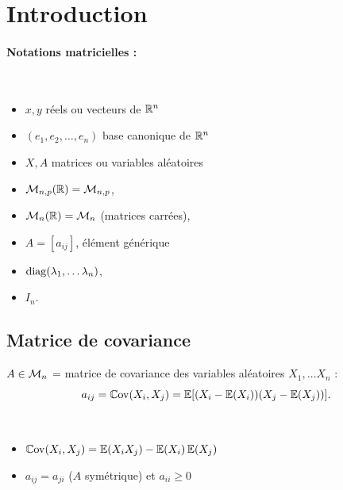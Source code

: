 \section{Introduction} \label{sec:LinAlg-Intro}

\paragraph*{Notations matricielles :} ~
\begin{itemize}
  \item $x, y$  réels ou vecteurs de $\mathbb{R}^n$
  \item $(e_1, e_2, \dots, e_n)$ base canonique de $\mathbb{R}^n$
  \item $X, A$  matrices ou variables aléatoires
  \item $\mathcal{M}_{n, p}(\mathbb{R}) = \mathcal{M}_{n, p}$, 
  \item $\mathcal{M}_n(\mathbb{R}) = \mathcal{M}_n$ (matrices carrées), 
  \item $A = [a_{ij}]$, élément générique
  \item $\operatorname{diag}(\lambda_1, \dots \lambda_n)$, 
  \item $I_n$.
\end{itemize}

\subsection{Matrice de covariance} \label{sec:MatCov}

\begin{definition}
  $A \in \mathcal{M}_n$ = matrice de covariance des variables aléatoires $X_1, \dots X_n$ :
  $$
  a_{ij} = \operatorname{\mathbb{C}ov}(X_i, X_j) = \operatorname{\mathbb{E}}[(X_i - \operatorname{\mathbb{E}}(X_i)) (X_j - \operatorname{\mathbb{E}}(X_j))].
  $$
\end{definition}

\begin{proposition} ~
  \begin{itemize}
   \item $\operatorname{\mathbb{C}ov}(X_i, X_j) = \operatorname{\mathbb{E}}(X_i X_j) - \operatorname{\mathbb{E}}(X_i) \operatorname{\mathbb{E}}(X_j)$
   \item $a_{ij} = a_{ji}$ ($A$ symétrique) et $a_{ii} \geq 0$
  \end{itemize}
\end{proposition}

